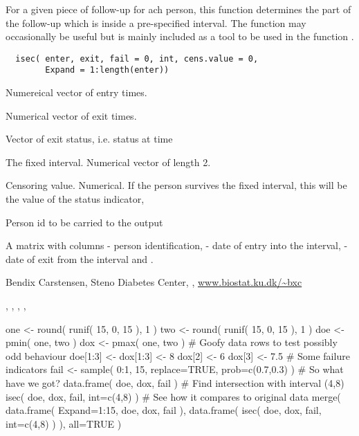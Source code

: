 \begin{Description}\relax
For a given piece of follow-up for ach person, this function determines
the part of the follow-up which is inside a pre-specified interval. The
function may occasionally be useful but is mainly included as a tool to
be used in the function .
\end{Description}
\begin{Usage}
\begin{verbatim}
  isec( enter, exit, fail = 0, int, cens.value = 0,
        Expand = 1:length(enter))
\end{verbatim}
\end{Usage}
\begin{Arguments}
\begin{ldescription}
\item[\code{enter}] Numereical vector of entry times.
\item[\code{exit}] Numerical vector of exit times.
\item[\code{fail}] Vector of exit status, i.e. status at time 
\item[\code{int}] The fixed interval. Numerical vector of length 2.
\item[\code{cens.value}] Censoring value. Numerical. If the person survives the fixed
interval, this will be the value of the status indicator, 
\item[\code{Expand}] Person id to be carried to the output
\end{ldescription}
\end{Arguments}
\begin{Value}
A matrix with columns  - person identification,
 - date of entry into the interval,  - date of exit
from the interval and .
\end{Value}
\begin{Author}\relax
Bendix Carstensen, Steno Diabetes Center,
, \url{www.biostat.ku.dk/~bxc}
\end{Author}
\begin{SeeAlso}\relax
{},
,
,
,
\end{SeeAlso}
\begin{Examples}
\begin{ExampleCode}
one <- round( runif( 15, 0, 15 ), 1 )
two <- round( runif( 15, 0, 15 ), 1 )
doe <- pmin( one, two )
dox <- pmax( one, two )
# Goofy data rows to test possibly odd behaviour
doe[1:3] <- dox[1:3] <- 8
dox[2] <- 6
dox[3] <- 7.5
# Some failure indicators
fail <- sample( 0:1, 15, replace=TRUE, prob=c(0.7,0.3) )
# So what have we got?
data.frame( doe, dox, fail )
# Find intersection with interval (4,8)
isec( doe, dox, fail, int=c(4,8) )
# See how it compares to original data
merge( data.frame( Expand=1:15, doe, dox, fail ),
       data.frame( isec( doe, dox, fail, int=c(4,8) ) ), all=TRUE )
  \end{ExampleCode}
\end{Examples}

